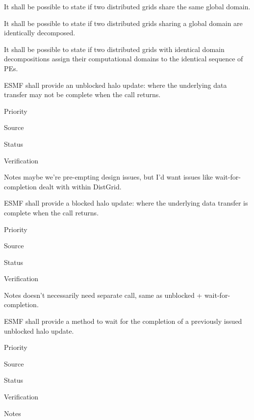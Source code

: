 

It shall be possible to state if two distributed grids share the same
global domain.


It shall be possible to state if two distributed grids sharing a
global domain are identically decomposed.


It shall be possible to state if two distributed grids with identical
domain decompositions assign their computational domains to the
identical sequence of PEs.



ESMF shall provide an unblocked halo update: where the underlying
data transfer may not be complete when the call returns.

\begin{reqlist}
\item[Priority]
\item[Source]
\item[Status]
\item[Verification]
\item[Notes] maybe we're pre-empting design issues, but I'd want
  issues like wait-for-completion dealt with within DistGrid.
\end{reqlist}


ESMF shall provide a blocked halo update: where the underlying
data transfer is complete when the call returns.

\begin{reqlist}
\item[Priority]
\item[Source]
\item[Status]
\item[Verification]
\item[Notes] doesn't necessarily need separate call, same as unblocked
  + wait-for-completion.
\end{reqlist}


ESMF shall provide a method to wait for the completion of a previously
issued unblocked halo update.

\begin{reqlist}
\item[Priority]
\item[Source]
\item[Status]
\item[Verification]
\item[Notes]
\end{reqlist}

